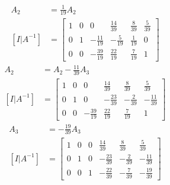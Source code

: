\documentclass{article}
\begin{document}
\begin{align*}
	A_2 & = \frac{1}{19}A_2 \\
	[I|A^{-1}] & = \left[ \begin{array}{ccc|ccc}
		1 & 0 & 0 & \frac{14}{39} & \frac{8}{39} & \frac{5}{39} \\
		0 & 1 & -\frac{11}{19} & -\frac{5}{19} & \frac{1}{19} & 0 \\
		0 & 0 & -\frac{39}{19} & \frac{22}{19} & \frac{7}{19} & 1
	\end{array} \right]
\end{align*}
\begin{align*}
	A_2 & = A_2 - \frac{11}{39}A_3 \\
	[I|A^{-1}] & = \left[ \begin{array}{ccc|ccc}
		1 & 0 & 0 & \frac{14}{39} & \frac{8}{39} & \frac{5}{39} \\
		0 & 1 & 0 & -\frac{23}{39} & -\frac{2}{39} & -\frac{11}{39} \\
		0 & 0 & -\frac{39}{19} & \frac{22}{19} & \frac{7}{19} & 1
	\end{array} \right]
\end{align*}
\begin{align*}
	A_3 & = -\frac{19}{39}A_3 \\
	[I|A^{-1}] & = \left[ \begin{array}{ccc|ccc}
		1 & 0 & 0 & \frac{14}{39} & \frac{8}{39} & \frac{5}{39} \\
		0 & 1 & 0 & -\frac{23}{39} & -\frac{2}{39} & -\frac{11}{39} \\
		0 & 0 & 1 & -\frac{22}{39} & -\frac{7}{39} & -\frac{19}{39}
	\end{array} \right]
\end{align*}
\end{document}
